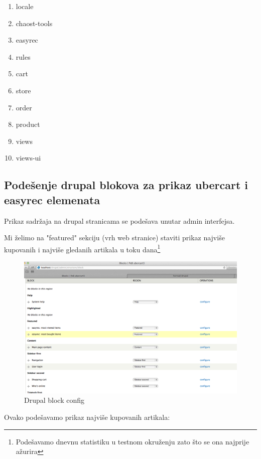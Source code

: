 \documentclass[times, utf8, seminar]{fit}
\begin{document}
{{{\begin{enumerate}
\item locale
\item chaost-tools
\item easyrec
\item rules
\item cart
\item store
\item order
\item product
\item views
\item views-ui
\end{enumerate}

\subsection{Podešenje drupal blokova za prikaz ubercart i easyrec elemenata}

Prikaz sadržaja na drupal stranicama se podešava unutar admin interfejsa.

Mi želimo na "featured" sekciju (vrh web stranice) staviti prikaz najviše kupovanih i najviše gledanih artikala u toku dana\footnote{Podešavamo dnevnu statistiku u testnom okruženju zato što se ona najprije ažurira}

\begin{figure}[H]
\centering
\includegraphics[width=12cm]{img/easyrec_ubercart_blocks_config_1.png}
\caption{Drupal block config}
\end{figure}

Ovako podešavamo prikaz najviše kupovanih artikala:

}}}
\end{document}
